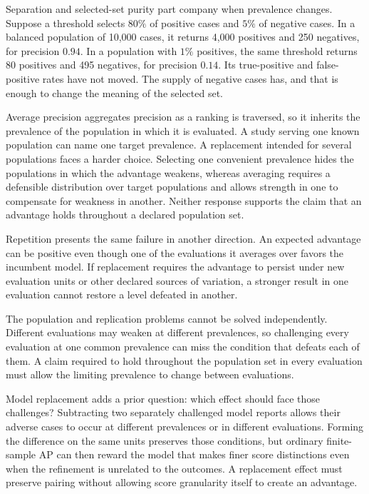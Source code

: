 \documentclass[11pt]{article}
\theoremstyle{remark}
\begin{document}
Separation and selected-set purity part company when prevalence changes. Suppose a threshold selects $80\%$ of positive cases and $5\%$ of negative cases. In a balanced population of 10,000 cases, it returns 4,000 positives and 250 negatives, for precision $0.94$. In a population with $1\%$ positives, the same threshold returns 80 positives and 495 negatives, for precision $0.14$. Its true-positive and false-positive rates have not moved. The supply of negative cases has, and that is enough to change the meaning of the selected set.

Average precision aggregates precision as a ranking is traversed, so it inherits the prevalence of the population in which it is evaluated. A study serving one known population can name one target prevalence. A replacement intended for several populations faces a harder choice. Selecting one convenient prevalence hides the populations in which the advantage weakens, whereas averaging requires a defensible distribution over target populations and allows strength in one to compensate for weakness in another. Neither response supports the claim that an advantage holds throughout a declared population set.

Repetition presents the same failure in another direction. An expected advantage can be positive even though one of the evaluations it averages over favors the incumbent model. If replacement requires the advantage to persist under new evaluation units or other declared sources of variation, a stronger result in one evaluation cannot restore a level defeated in another.

The population and replication problems cannot be solved independently. Different evaluations may weaken at different prevalences, so challenging every evaluation at one common prevalence can miss the condition that defeats each of them. A claim required to hold throughout the population set in every evaluation must allow the limiting prevalence to change between evaluations.

Model replacement adds a prior question: which effect should face those challenges? Subtracting two separately challenged model reports allows their adverse cases to occur at different prevalences or in different evaluations. Forming the difference on the same units preserves those conditions, but ordinary finite-sample AP can then reward the model that makes finer score distinctions even when the refinement is unrelated to the outcomes. A replacement effect must preserve pairing without allowing score granularity itself to create an advantage.
\end{document}
